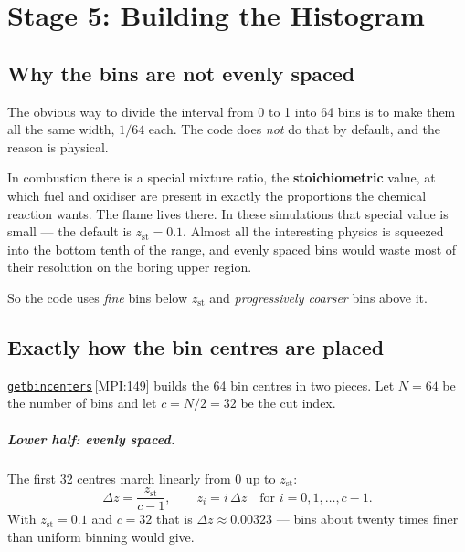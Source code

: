 \documentclass[11pt,a4paper]{report}
\newcommand{\srcbase}{vscode://file/Users/syellapa/Documents/Research/2026/ANSYS/Multi-ScalarPDF}
\newcommand{\srctag}[1]{{\footnotesize\textcolor{TagGray}{[#1]}}}
\newcommand{\Mpi}[2]{\href{\srcbase/EnsightPDFHybridDatasetMPI.py:#1}{\texttt{#2}}\,\srctag{MPI:#1}}
\newcommand{\term}[1]{\textbf{#1}}
\renewcommand{\_}{\origtextunderscore\allowbreak}
\begin{document}
\chapter{Stage 5: Building the Histogram}

\section{Why the bins are not evenly spaced}

The obvious way to divide the interval from 0 to 1 into 64 bins is to make them all the same
width, $1/64$ each. The code does \emph{not} do that by default, and the reason is physical.

In combustion there is a special mixture ratio, the \term{stoichiometric} value, at which
fuel and oxidiser are present in exactly the proportions the chemical reaction wants. The
flame lives there. In these simulations that special value is small --- the default is
$z_{\text{st}} = 0.1$. Almost all the interesting physics is squeezed into the bottom tenth of
the range, and evenly spaced bins would waste most of their resolution on the boring upper
region.

So the code uses \emph{fine} bins below $z_{\text{st}}$ and \emph{progressively coarser} bins
above it.

\section{Exactly how the bin centres are placed}

\Mpi{149}{get\_bin\_centers} builds the 64 bin centres in two pieces. Let $N = 64$ be the
number of bins and let $c = N/2 = 32$ be the cut index.

\paragraph{Lower half: evenly spaced.}
The first 32 centres march linearly from 0 up to $z_{\text{st}}$:
\[
  \Delta z = \frac{z_{\text{st}}}{c-1}, \qquad
  z_i = i\,\Delta z \quad \text{for } i = 0, 1, \dots, c-1 .
\]
With $z_{\text{st}} = 0.1$ and $c = 32$ that is $\Delta z \approx 0.00323$ --- bins about
twenty times finer than uniform binning would give.
\end{document}
